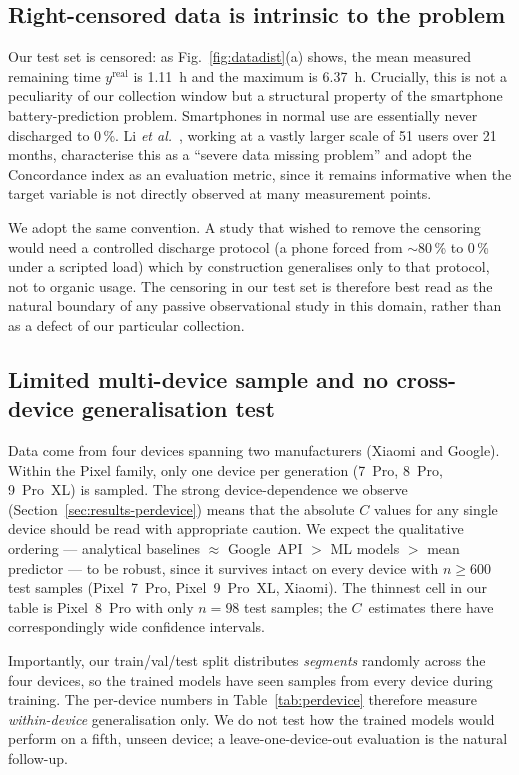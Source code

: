 \documentclass[conference]{IEEEtran}
\begin{document}
\subsection{Right-censored data is intrinsic to the problem}
Our test set is censored: as Fig.~\ref{fig:datadist}(a) shows, the
mean measured remaining time $y^{\text{real}}$ is \SI{1.11}{\hour} and
the maximum is \SI{6.37}{\hour}. Crucially, this is not a peculiarity
of our collection window but a structural property of the smartphone
battery-prediction problem. Smartphones in normal use are essentially
never discharged to 0\,\%. Li \emph{et al.}~\cite{li2018predicting},
working at a vastly larger scale of 51 users over 21 months,
characterise this as a ``severe data missing problem'' and adopt the
Concordance index as an evaluation metric, since it remains
informative when the target variable is not directly observed at
many measurement points.

We adopt the same convention. A study that wished to remove the
censoring would need a controlled discharge protocol (a phone forced
from $\sim$80\,\% to 0\,\% under a scripted load) which by construction
generalises only to that protocol, not to organic usage. The censoring
in our test set is therefore best read as the natural boundary of any
passive observational study in this domain, rather than as a defect of
our particular collection.

\subsection{Limited multi-device sample and no cross-device generalisation test}
Data come from four devices spanning two manufacturers (Xiaomi and
Google). Within the Pixel family, only one device per generation
(7~Pro, 8~Pro, 9~Pro~XL) is sampled. The strong device-dependence we
observe (Section~\ref{sec:results-perdevice}) means that the absolute
$C$ values for any single device should be read with appropriate
caution. We expect the qualitative ordering --- analytical baselines
$\approx$ Google~API $>$ ML models $>$ mean predictor --- to be
robust, since it survives intact on every device with $n \geq 600$
test samples (Pixel~7~Pro, Pixel~9~Pro~XL, Xiaomi). The thinnest cell
in our table is Pixel~8~Pro with only $n{=}98$ test samples; the
$C$~estimates there have correspondingly wide confidence intervals.

Importantly, our train/val/test split distributes \emph{segments}
randomly across the four devices, so the trained models have seen
samples from every device during training. The per-device numbers in
Table~\ref{tab:perdevice} therefore measure \emph{within-device}
generalisation only. We do not test how the trained models would
perform on a fifth, unseen device; a leave-one-device-out evaluation
is the natural follow-up.
\end{document}
